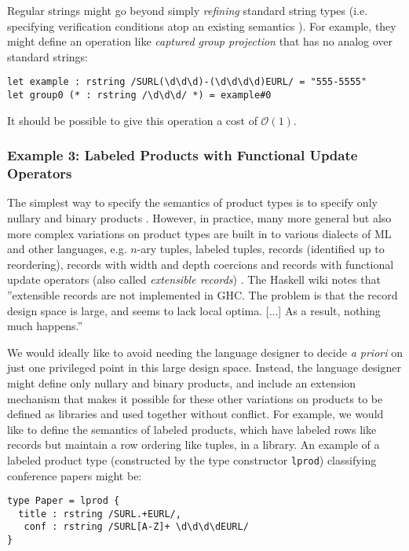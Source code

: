 Regular strings might go beyond simply \emph{refining} standard string types (i.e. specifying verification conditions atop an existing semantics \cite{Freeman91}). For example, they might define an operation like \emph{captured group projection} that has no analog over standard strings:
\begin{lstlisting}[numbers=none]
let example : rstring /SURL(\d\d\d)-(\d\d\d\d)EURL/ = "555-5555"
let group0 (* : rstring /\d\d\d/ *) = example#0
\end{lstlisting}
It should be possible to give this operation a cost of $\mathcal{O}(1)$. %

\subsubsection{Example 3: Labeled Products with Functional Update Operators}\label{sec:lprod}
The simplest way to specify the semantics of product types is to specify only nullary and binary products \cite{pfpl}. However, in practice, many more general but also more complex variations on product types are built in to various dialects of ML and other languages, e.g. $n$-ary tuples, labeled tuples, 
records (identified up to reordering), 
records with width and depth coercions \cite{Cardelli:1984:SMI:1096.1098} and records with functional update operators (also called \emph{extensible records}) \cite{ocaml-manual}. {The Haskell wiki notes that ''extensible records  are not implemented in GHC. The problem is that the record design space is large, and seems to lack local optima. [...] As a result, nothing much happens.'' \cite{GHCFAQ}}%


We would ideally like to avoid needing the language designer to decide \emph{a priori} on just one privileged point in this large design space. Instead, the language designer might define only nullary and binary products, and include an extension mechanism that makes it possible for these other variations on products to be defined as libraries and  used together without conflict. For example, we would like to define the semantics of labeled products, which have labeled rows like records but maintain a row ordering like tuples, in a library. An example of a labeled product type (constructed by the type constructor \lstinline{lprod}) classifying conference papers might be:
\begin{lstlisting}[numbers=none]
type Paper = lprod {
  title : rstring /SURL.+EURL/,
   conf : rstring /SURL[A-Z]+ \d\d\d\dEURL/
}
\end{lstlisting}

